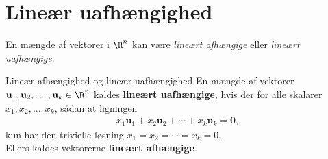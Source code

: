 \section{Lineær uafhængighed}
En mængde af vektorer i $\R^n$ kan være \textit{lineært afhængige} eller \textit{lineært uafhængige}.
%
%
% 
\begin{defn}{Lineær afhængighed og lineær uafhængighed}{}
En mængde af vektorer $\mathbf{u}_1, \mathbf{u}_2, \ldots , \mathbf{u}_k \in \R^n$ kaldes \textbf{lineært uafhængige}, hvis der for alle skalarer $x_1, x_2, \ldots , x_k$, sådan at ligningen 
\begin{align*}
x_1\mathbf{u}_1 + x_2\mathbf{u}_2 + \cdots + x_k \mathbf{u}_k = \mathbf{0}, 
\end{align*}
kun har den trivielle løsning $x_1 = x_2 = \cdots = x_k = 0$.
\\
Ellers kaldes vektorerne \textbf{lineært afhængige}.
\end{defn}  
%
